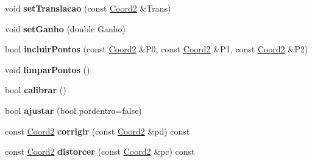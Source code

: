 \begin{DoxyCompactItemize}
\item 
void {\bfseries set\+Translacao} (const \hyperlink{structCoord2}{Coord2} \&Trans)\hypertarget{classDistRadial_a4d177688da137defc66ee1588d2452d3}{}\label{classDistRadial_a4d177688da137defc66ee1588d2452d3}

\item 
void {\bfseries set\+Ganho} (double Ganho)\hypertarget{classDistRadial_ab69dc2f8b60570b5e1f104733cb0d587}{}\label{classDistRadial_ab69dc2f8b60570b5e1f104733cb0d587}

\item 
bool {\bfseries incluir\+Pontos} (const \hyperlink{structCoord2}{Coord2} \&P0, const \hyperlink{structCoord2}{Coord2} \&P1, const \hyperlink{structCoord2}{Coord2} \&P2)\hypertarget{classDistRadial_a6688664ee7aaa2df8960d7fb7911df08}{}\label{classDistRadial_a6688664ee7aaa2df8960d7fb7911df08}

\item 
void {\bfseries limpar\+Pontos} ()\hypertarget{classDistRadial_aaaec2b5cef857e57ed09ae74311a87ef}{}\label{classDistRadial_aaaec2b5cef857e57ed09ae74311a87ef}

\item 
bool {\bfseries calibrar} ()\hypertarget{classDistRadial_acc8bc700f7b931b3fa2df67c16b78f98}{}\label{classDistRadial_acc8bc700f7b931b3fa2df67c16b78f98}

\item 
bool {\bfseries ajustar} (bool pordentro=false)\hypertarget{classDistRadial_a4fa920586b737130210143d0538677b1}{}\label{classDistRadial_a4fa920586b737130210143d0538677b1}

\item 
const \hyperlink{structCoord2}{Coord2} {\bfseries corrigir} (const \hyperlink{structCoord2}{Coord2} \&pd) const \hypertarget{classDistRadial_a1cea572c1d3968581a2260ab9a6d8ab9}{}\label{classDistRadial_a1cea572c1d3968581a2260ab9a6d8ab9}

\item 
const \hyperlink{structCoord2}{Coord2} {\bfseries distorcer} (const \hyperlink{structCoord2}{Coord2} \&pc) const \hypertarget{classDistRadial_a6f3391b5e29e2207746dc1a3f61bffa8}{}\label{classDistRadial_a6f3391b5e29e2207746dc1a3f61bffa8}

\end{DoxyCompactItemize}
